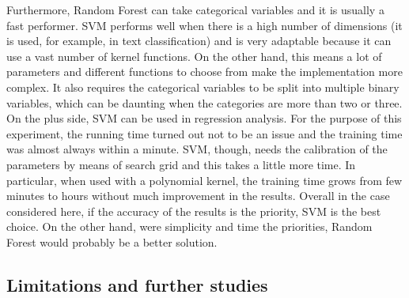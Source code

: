 \documentclass [a4paper,12 pt]{article}
\begin{document}
 Furthermore, Random Forest can take categorical variables and it is usually a fast performer. SVM performs well when there is a high number of dimensions (it is used, for example, in text classification) and is very adaptable because it can use a vast number of kernel functions. On the other hand, this means a lot of parameters and different functions to choose from make the implementation more complex. It also requires the categorical variables to be split into multiple binary variables, which can be daunting when the categories are more than two or three. On the plus side, SVM can be used in regression analysis. 
For the purpose of this experiment, the running time turned out not to be an issue and the training time was almost always within a minute. SVM, though, needs the calibration of the parameters by means of search grid and this takes a little more time. In particular, when used with a polynomial kernel, the training time grows from few minutes to hours without much improvement in the results. Overall in the case considered here, if the accuracy of the results is the priority, SVM is the best choice. On the other hand, were simplicity and time the priorities, Random Forest would probably be a better solution.



\subsection{Limitations and further studies}
\end{document}
